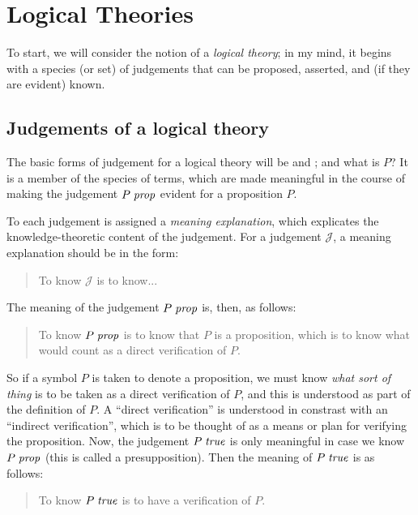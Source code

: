 \documentclass[main.tex]{subfiles}
\begin{document}
\onehalfspacing

\chapter{Logical Theories}

To start, we will consider the notion of a \emph{logical theory}; in my mind,
it begins with a species (or set) of judgements that can be proposed, asserted,
and (if they are evident) known.

\section{Judgements of a logical theory}

The basic forms of judgement for a logical theory will be
 and ; and what is $P$?
It is a member of the species of terms, which are made meaningful in
the course of making the judgement $P\;\mathit{prop}$ evident for a
proposition $P$.

To each judgement is assigned a \emph{meaning explanation}, which explicates
the knowledge-theoretic content of the judgement. For a judgement
$\mathcal{J}$, a meaning explanation should be in the form:

\begin{quote}
  To know $\mathcal{J}$ is to know...
\end{quote}

The meaning of the judgement $P\;\mathit{prop}$ is, then, as follows:

\begin{quote}
  To know $P\;\mathit{prop}$ is to know that $P$ is a proposition, which is to know
  what would count as a direct verification of $P$.
\end{quote}

So if a symbol $P$ is taken to denote a proposition, we must know \emph{what
sort of thing} is to be taken as a direct verification of $P$, and this is
understood as part of the definition of $P$. A ``direct verification'' is
understood in constrast with an ``indirect verification'', which is to be
thought of as a means or plan for verifying the proposition. Now, the judgement
$P\;\mathit{true}$ is only meaningful in case we know $P\;\mathit{prop}$ (this is called a
presupposition). Then the meaning of $P\;\mathit{true}$ is as follows:

\begin{quote}
  To know $P\;\mathit{true}$ is to have a verification of $P$.
\end{quote}
\end{document}
